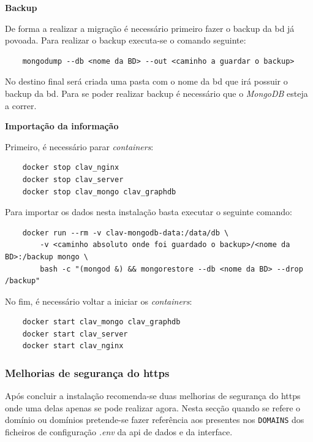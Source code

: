 \begin{description}
    \item \textbf{Backup}

    De forma a realizar a migração é necessário primeiro fazer o backup da \acrshort{bd} já povoada. Para realizar o backup executa-se o comando seguinte:
    \footnotesize
    \begin{verbatim}
    mongodump --db <nome da BD> --out <caminho a guardar o backup>
    \end{verbatim}
    \normalsize
    \vspace{-0.5cm}
    No destino final será criada uma pasta com o nome da \acrshort{bd} que irá possuir o backup da \acrshort{bd}.
    Para se poder realizar backup é necessário que o \textit{MongoDB} esteja a correr.
    \item \textbf{Importação da informação}

    Primeiro, é necessário parar \textit{containers}:
    \footnotesize
    \begin{verbatim}
    docker stop clav_nginx
    docker stop clav_server
    docker stop clav_mongo clav_graphdb
    \end{verbatim}
    \normalsize
    \vspace{-0.3cm}
    Para importar os dados nesta instalação basta executar o seguinte comando:
    \footnotesize
    \begin{verbatim}
    docker run --rm -v clav-mongodb-data:/data/db \
        -v <caminho absoluto onde foi guardado o backup>/<nome da BD>:/backup mongo \
        bash -c "(mongod &) && mongorestore --db <nome da BD> --drop /backup"
    \end{verbatim}
    \normalsize
    \vspace{-0.3cm}
    No fim, é necessário voltar a iniciar os \textit{containers}:
    \footnotesize
    \begin{verbatim}
    docker start clav_mongo clav_graphdb
    docker start clav_server
    docker start clav_nginx
    \end{verbatim}
    \normalsize
    \vspace{-0.5cm}
\end{description}

\subsubsection{Melhorias de segurança do \acrshort{https}}\label{sec:inst-melhorias}
Após concluir a instalação recomenda-se duas melhorias de segurança do \acrshort{https} onde uma delas apenas se pode realizar agora. Nesta secção quando se refere o domínio ou domínios pretende-se fazer referência aos presentes nos \texttt{DOMAINS} dos ficheiros de configuração \textit{.env} da \acrshort{api} de dados e da interface.

